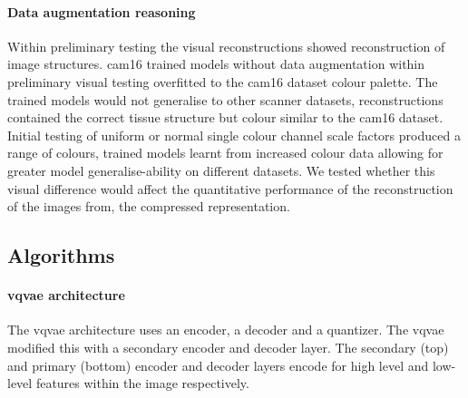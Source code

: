 \documentclass[review]{elsarticle}
\begin{document}
\paragraph{Data augmentation reasoning} Within preliminary testing the visual reconstructions showed reconstruction of image structures. \gls{cam16} trained models without data augmentation within preliminary visual testing overfitted to the \gls{cam16} dataset colour palette. The trained models would not generalise to other scanner datasets, reconstructions contained the correct tissue structure but colour similar to the \gls{cam16} dataset. Initial testing of uniform or normal single colour channel scale factors produced a range of colours, trained models learnt from increased colour data allowing for greater model generalise-ability on different datasets. We tested whether this visual difference would affect the quantitative performance of the reconstruction of the images from, the compressed representation.


\subsection{Algorithms}
\paragraph{\gls{vqvae} architecture} The \gls{vqvae} architecture uses an encoder, a decoder and a quantizer. The \gls{vqvae} modified this with a secondary encoder and decoder layer. The secondary (top) and primary (bottom) encoder and decoder layers encode for high level and low-level features within the image respectively.
\end{document}
